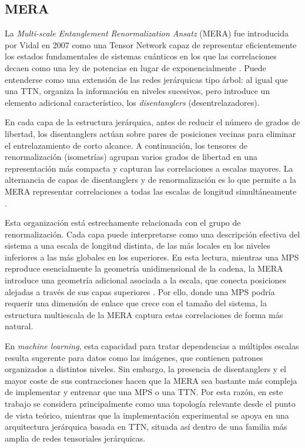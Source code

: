 \subsection{MERA}

La \textit{Multi-scale Entanglement Renormalization Ansatz} (MERA) fue introducida por Vidal en 2007 como una Tensor Network capaz de representar eficientemente los estados fundamentales de sistemas cuánticos en los que las correlaciones decaen como una ley de potencias en lugar de exponencialmente . Puede entenderse como una extensión de las redes jerárquicas tipo árbol: al igual que una TTN, organiza la información en niveles sucesivos, pero introduce un elemento adicional característico, los \textit{disentanglers} (desentrelazadores).

En cada capa de la estructura jerárquica, antes de reducir el número de grados de libertad, los disentanglers actúan sobre pares de posiciones vecinas para eliminar el entrelazamiento de corto alcance. A continuación, los tensores de renormalización (isometrías) agrupan varios grados de libertad en una representación más compacta y capturan las correlaciones a escalas mayores. La alternancia de capas de disentanglers y de renormalización es lo que permite a la MERA representar correlaciones a todas las escalas de longitud simultáneamente .

Esta organización está estrechamente relacionada con el grupo de renormalización. Cada capa puede interpretarse como una descripción efectiva del sistema a una escala de longitud distinta, de las más locales en los niveles inferiores a las más globales en los superiores. En esta lectura, mientras una MPS reproduce esencialmente la geometría unidimensional de la cadena, la MERA introduce una geometría adicional asociada a la escala, que conecta posiciones alejadas a través de sus capas superiores . Por ello, donde una MPS podría requerir una dimensión de enlace que crece con el tamaño del sistema, la estructura multiescala de la MERA captura estas correlaciones de forma más natural.

En \textit{machine learning}, esta capacidad para tratar dependencias a múltiples escalas resulta sugerente para datos como las imágenes, que contienen patrones organizados a distintos niveles. Sin embargo, la presencia de disentanglers y el mayor coste de sus contracciones hacen que la MERA sea bastante más compleja de implementar y entrenar que una MPS o una TTN. Por esta razón, en este trabajo se considera principalmente como una topología relevante desde el punto de vista teórico, mientras que la implementación experimental se apoya en una arquitectura jerárquica basada en TTN, situada así dentro de una familia más amplia de redes tensoriales jerárquicas.
 
